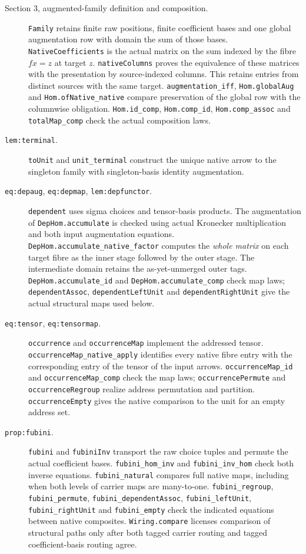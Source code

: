 \documentclass[11pt]{article}
\begin{document}
\begin{description}
\item[Section 3, augmented-family definition and composition.]
\verb|Family| retains finite raw positions, finite coefficient bases and one
global augmentation row with domain the sum of those bases.
\verb|NativeCoefficients| is the actual matrix on the sum indexed by the
fibre $fx=z$ at target $z$. \verb|nativeColumns| proves the equivalence of
these matrices with the presentation by source-indexed columns. This retains
entries from distinct sources with the same target. \verb|augmentation_iff|,
\verb|Hom.globalAug| and \verb|Hom.ofNative_native| compare preservation of
the global row with the columnwise obligation. \verb|Hom.id_comp|,
\verb|Hom.comp_id|, \verb|Hom.comp_assoc| and \verb|totalMap_comp| check the
actual composition laws.

\item[\texttt{lem:terminal}.]
\verb|toUnit| and \verb|unit_terminal| construct the unique native arrow
to the singleton family with singleton-basis identity augmentation.

\item[\texttt{eq:depaug}, \texttt{eq:depmap}, \texttt{lem:depfunctor}.]
\verb|dependent| uses sigma choices and tensor-basis products.
The augmentation of \verb|DepHom.accumulate| is checked using
actual Kronecker multiplication and both input augmentation equations.
\verb|DepHom.accumulate_native_factor| computes the \emph{whole matrix}
on each target fibre as the inner stage followed by the outer stage.
The intermediate domain retains the as-yet-unmerged outer tags.
\verb|DepHom.accumulate_id| and \verb|DepHom.accumulate_comp| check map
laws; \verb|dependentAssoc|, \verb|dependentLeftUnit| and
\verb|dependentRightUnit| give the actual structural maps used below.

\item[\texttt{eq:tensor}, \texttt{eq:tensormap}.]
\verb|occurrence| and \verb|occurrenceMap| implement the addressed tensor.
\verb|occurrenceMap_native_apply| identifies every native fibre entry with
the corresponding entry of the tensor of the input arrows.
\verb|occurrenceMap_id| and \verb|occurrenceMap_comp| check the map laws;
\verb|occurrencePermute| and \verb|occurrenceRegroup| realize address
permutation and partition. \verb|occurrenceEmpty| gives the native
comparison to the unit for an empty address set.

\item[\texttt{prop:fubini}.]
\verb|fubini| and \verb|fubiniInv| transport the raw choice tuples and
permute the actual coefficient bases. \verb|fubini_hom_inv| and
\verb|fubini_inv_hom| check both inverse equations.
\verb|fubini_natural| compares full native maps, including when both
levels of carrier maps are many-to-one. \verb|fubini_regroup|,
\verb|fubini_permute|, \verb|fubini_dependentAssoc|,
\verb|fubini_leftUnit|, \verb|fubini_rightUnit| and \verb|fubini_empty|
check the indicated equations between native composites.
\verb|Wiring.compare| licenses comparison of structural paths only after
both tagged carrier routing and tagged coefficient-basis routing agree.


\end{description}
\end{document}
